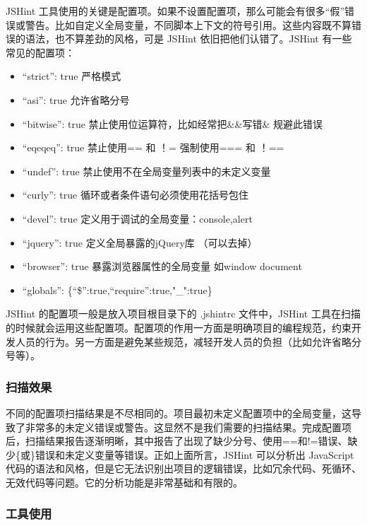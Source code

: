 \documentclass[hyperref, a4paper]{ctexart}
\providecommand{\tightlist}{%
  \setlength{\itemsep}{0pt}\setlength{\parskip}{0pt}}
\begin{document}
JSHint
工具使用的关键是配置项。如果不设置配置项，那么可能会有很多``假''错误或警告。比如自定义全局变量，不同脚本上下文的符号引用。这些内容既不算错误的语法，也不算差劲的风格，可是
JSHint 依旧把他们认错了。JSHint 有一些常见的配置项：

\begin{itemize}
\tightlist
\item
  ``strict'': true 严格模式
\item
  ``asi'': true 允许省略分号
\item
  ``bitwise'': true 禁止使用位运算符，比如经常把\&\&写错\& 规避此错误
\item
  ``eqeqeq'': true 禁止使用== 和 ！= 强制使用=== 和 ！==
\item
  ``undef'': true 禁止使用不在全局变量列表中的未定义变量
\item
  ``curly'': true 循环或者条件语句必须使用花括号包住
\item
  ``devel'': true 定义用于调试的全局变量：console,alert
\item
  ``jquery'': true 定义全局暴露的jQuery库 （可以去掉）
\item
  ``browser'': true 暴露浏览器属性的全局变量 如window document
\item
  ``globals'': \{``\$'':true,``require'':true,"\_":true\}
\end{itemize}

JSHint 的配置项一般是放入项目根目录下的 .jshintrc 文件中，JSHint
工具在扫描的时候就会运用这些配置项。配置项的作用一方面是明确项目的编程规范，约束开发人员的行为。另一方面是避免某些规范，减轻开发人员的负担（比如允许省略分号等）。

\hypertarget{ux626bux63cfux6548ux679c-2}{%
\subsubsection{扫描效果}\label{ux626bux63cfux6548ux679c-2}}

不同的配置项扫描结果是不尽相同的。项目最初未定义配置项中的全局变量，这导致了非常多的未定义错误或警告。这显然不是我们需要的扫描结果。完成配置项后，扫描结果报告逐渐明晰，其中报告了出现了缺少分号、使用==和!=错误、缺少\{或\}错误和未定义变量等错误。正如上面所言，JSHint
可以分析出 JavaScript
代码的语法和风格，但是它无法识别出项目的逻辑错误，比如冗余代码、死循环、无效代码等问题。它的分析功能是非常基础和有限的。

\hypertarget{ux5de5ux5177ux4f7fux7528}{%
\subsubsection{工具使用}\label{ux5de5ux5177ux4f7fux7528}}
\end{document}
